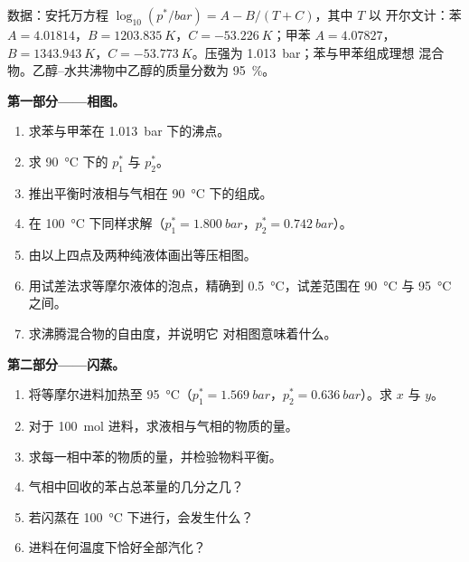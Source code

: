 \begin{problem}
\label{pb:b2:liquid-vapour-diagrams:1}
数据：安托万方程 $\log_{10}(p^*/\unit{bar}) = A - B/(T + C)$，其中 $T$ 以
开尔文计：苯 $A = 4.01814$，$B = \qty{1203.835}{K}$，$C =
\qty{-53.226}{K}$；甲苯 $A = 4.07827$，$B = \qty{1343.943}{K}$，$C =
\qty{-53.773}{K}$。压强为 \qty{1.013}{bar}；苯与甲苯组成理想
混合物。乙醇–水共沸物中乙醇的质量分数为 95~\%。

\medskip
\noindent\textbf{第一部分——相图。}
\begin{enumerate}
  \item 求苯与甲苯在 \qty{1.013}{bar} 下的沸点。
  \item 求 \qty{90}{\degreeCelsius} 下的 $p_1^*$ 与 $p_2^*$。
  \item 推出平衡时液相与气相在
        \qty{90}{\degreeCelsius} 下的组成。
  \item 在 \qty{100}{\degreeCelsius} 下同样求解（$p_1^* = \qty{1.800}{bar}$，$p_2^* =
        \qty{0.742}{bar}$）。
  \item 由以上四点及两种纯液体画出等压相图。
  \item 用试差法求等摩尔液体的泡点，精确到
        \qty{0.5}{\degreeCelsius}，试差范围在 \qty{90}{\degreeCelsius} 与
        \qty{95}{\degreeCelsius} 之间。
  \item 求沸腾混合物的自由度，并说明它
        对相图意味着什么。
\end{enumerate}

\medskip
\noindent\textbf{第二部分——闪蒸。}
\begin{enumerate}[resume]
  \item 将等摩尔进料加热至 \qty{95}{\degreeCelsius}（$p_1^* =
        \qty{1.569}{bar}$，$p_2^* = \qty{0.636}{bar}$）。求 $x$ 与 $y$。
  \item 对于 \qty{100}{mol} 进料，求液相与气相的物质的量。
  \item 求每一相中苯的物质的量，并检验物料平衡。
  \item 气相中回收的苯占总苯量的几分之几？
  \item 若闪蒸在 \qty{100}{\degreeCelsius} 下进行，会发生什么？
  \item 进料在何温度下恰好全部汽化？
\end{enumerate}


\end{problem}
